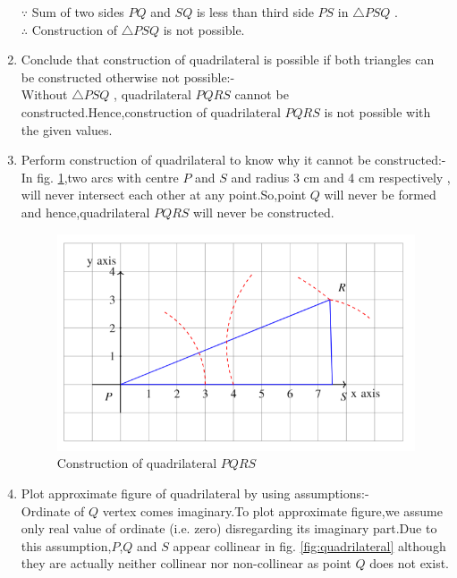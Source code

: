 \documentclass[journal,12pt,twocolumn]{IEEEtran}
\begin{document}
\begin{enumerate}
    $\because$ Sum of two sides $PQ$ and $SQ$ is less than third side $PS$ in $\triangle PSQ$ .
    \\
    $\therefore$ Construction of $\triangle PSQ$ is not possible.
    
    \item Conclude that construction of quadrilateral is possible if both triangles can be constructed otherwise not possible:-
    \\
    Without $\triangle PSQ$ , quadrilateral $PQRS$ cannot be constructed.Hence,construction of quadrilateral $PQRS$ is not possible with the given values.
    
    \item Perform construction of quadrilateral to know why it cannot be constructed:-
    \\
    In fig. \ref{fig:const_quadrilateral},two arcs with centre $P$ and $S$ and radius 3 cm and 4 cm respectively , will never intersect each other at any point.So,point $Q$ will never be formed and hence,quadrilateral $PQRS$ will never be constructed.
    
    \begin{figure}[!ht]
    \centering
    \includegraphics[width=\columnwidth]{Figure3}
    \caption{Construction of quadrilateral $PQRS$}
    \label{fig:const_quadrilateral}	
    \end{figure}
    
    \item Plot approximate figure of quadrilateral by using assumptions:-
    \\
    Ordinate of $Q$ vertex comes imaginary.To plot approximate figure,we assume only real value of ordinate (i.e. zero) disregarding its imaginary part.Due to this assumption,$P$,$Q$ and $S$ appear collinear in fig. \ref{fig:quadrilateral} although they are actually neither collinear nor non-collinear as point $Q$ does not exist.
    

\end{enumerate}
\end{document}
